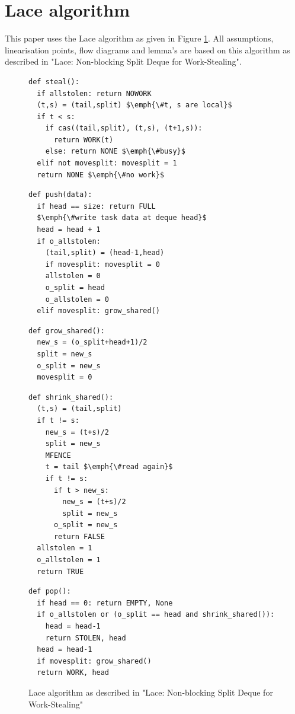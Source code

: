 \documentclass{sig-alternate-br}
\begin{document}
\section{Lace algorithm}
This paper uses the Lace algorithm as given in Figure \ref{fig:Lace}.
All assumptions, linearisation points, flow diagrams and lemma's are based on this algorithm as described in "Lace: Non-blocking Split Deque for Work-Stealing"\cite{vanDijk2014206}.
\begin{figure}
\begin{lstlisting}
def steal():
  if allstolen: return NOWORK
  (t,s) = (tail,split) $\emph{\#t, s are local}$
  if t < s:
    if cas((tail,split), (t,s), (t+1,s)):
      return WORK(t)
    else: return NONE $\emph{\#busy}$
  elif not movesplit: movesplit = 1
  return NONE $\emph{\#no work}$
\end{lstlisting}
\begin{lstlisting}[firstnumber=10]
def push(data):
  if head == size: return FULL
  $\emph{\#write task data at deque head}$
  head = head + 1
  if o_allstolen:
    (tail,split) = (head-1,head)
    if movesplit: movesplit = 0
    allstolen = 0
    o_split = head
    o_allstolen = 0
  elif movesplit: grow_shared()
\end{lstlisting}
\begin{lstlisting}[firstnumber=21]
def grow_shared():
  new_s = (o_split+head+1)/2
  split = new_s
  o_split = new_s
  movesplit = 0
\end{lstlisting}
\begin{lstlisting}[firstnumber=26]
def shrink_shared():
  (t,s) = (tail,split)
  if t != s:
    new_s = (t+s)/2
    split = new_s
    MFENCE
    t = tail $\emph{\#read again}$
    if t != s:
      if t > new_s:
        new_s = (t+s)/2
        split = new_s
      o_split = new_s
      return FALSE
  allstolen = 1
  o_allstolen = 1
  return TRUE
\end{lstlisting}
\begin{lstlisting}[firstnumber=42]
def pop():
  if head == 0: return EMPTY, None
  if o_allstolen or (o_split == head and shrink_shared()):
    head = head-1
    return STOLEN, head
  head = head-1
  if movesplit: grow_shared()
  return WORK, head
\end{lstlisting}
\caption{Lace algorithm as described in "Lace: Non-blocking Split Deque for Work-Stealing"\cite{vanDijk2014206}}
\label{fig:Lace}
\end{figure}
\end{document}
